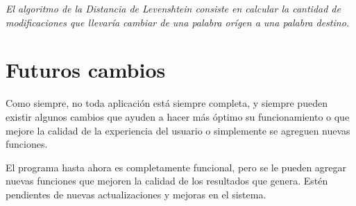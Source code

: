 \documentclass[12pt]{article}
\begin{document}
	\emph{El algoritmo de la \emph{Distancia de Levenshtein} consiste en calcular la cantidad de modificaciones que llevaría cambiar de una \emph{palabra orígen} a una \emph{palabra destino}.} \\
	
\section*{Futuros cambios}
	Como siempre, no toda aplicación está siempre completa, y siempre pueden existir algunos cambios que ayuden a hacer más óptimo su funcionamiento o que mejore la calidad de la experiencia del usuario o simplemente se agreguen nuevas funciones.
	
	El programa hasta ahora es completamente funcional, pero se le pueden agregar nuevas funciones que mejoren la calidad de los resultados que genera.
	Estén pendientes de nuevas actualizaciones y mejoras en el sistema.
\end{document}
